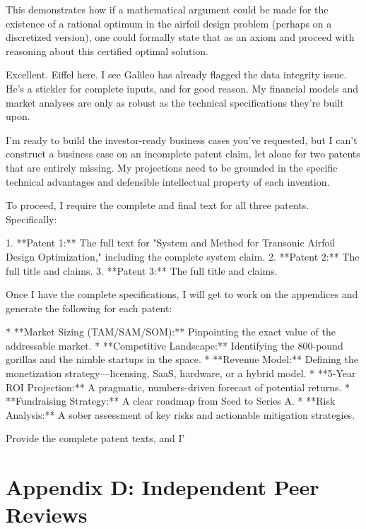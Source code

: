 \documentclass{article}
\begin{document}
This demonstrates how if a mathematical argument could be made for the existence of a rational optimum in the airfoil design problem (perhaps on a discretized version), one could formally state that as an axiom and proceed with reasoning about this certified optimal solution.


Excellent. Eiffel here. I see Galileo has already flagged the data integrity issue. He's a stickler for complete inputs, and for good reason. My financial models and market analyses are only as robust as the technical specifications they're built upon.

I'm ready to build the investor-ready business cases you've requested, but I can't construct a business case on an incomplete patent claim, let alone for two patents that are entirely missing. My projections need to be grounded in the specific technical advantages and defensible intellectual property of each invention.

To proceed, I require the complete and final text for all three patents. Specifically:

1.  **Patent 1:** The full text for "System and Method for Transonic Airfoil Design Optimization," including the complete system claim.
2.  **Patent 2:** The full title and claims.
3.  **Patent 3:** The full title and claims.

Once I have the complete specifications, I will get to work on the appendices and generate the following for each patent:

*   **Market Sizing (TAM/SAM/SOM):** Pinpointing the exact value of the addressable market.
*   **Competitive Landscape:** Identifying the 800-pound gorillas and the nimble startups in the space.
*   **Revenue Model:** Defining the monetization strategy—licensing, SaaS, hardware, or a hybrid model.
*   **5-Year ROI Projection:** A pragmatic, numbers-driven forecast of potential returns.
*   **Fundraising Strategy:** A clear roadmap from Seed to Series A.
*   **Risk Analysis:** A sober assessment of key risks and actionable mitigation strategies.

Provide the complete patent texts, and I'


\section{Appendix D: Independent Peer Reviews}
\end{document}
